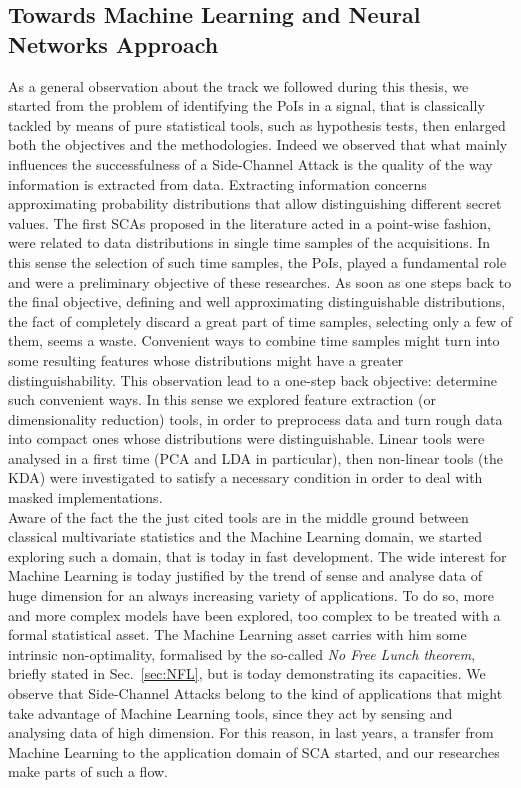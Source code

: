 \subsection{Towards Machine Learning and Neural Networks Approach}\label{sec:NN_intro} 
As a general observation about the track we followed during this thesis, we started from the problem of identifying the PoIs in a signal, that is classically tackled by means of pure statistical tools, such as hypothesis tests,  then enlarged both the objectives and the methodologies. Indeed we observed that what mainly influences the successfulness of a Side-Channel Attack is the quality of the way information is extracted from data. Extracting information concerns approximating probability distributions that allow distinguishing different secret values. The first SCAs proposed in the literature acted in a point-wise fashion, \ie were related to data distributions in single time samples of the acquisitions. In this sense the selection of such time samples, the PoIs, played a fundamental role and were a preliminary objective of these researches. As soon as one steps back to the final objective, \ie defining and well approximating distinguishable distributions, the fact of completely discard a great part of time samples, selecting only a few of them, seems a waste. Convenient ways to combine time samples might turn into some resulting features whose distributions might have a greater distinguishability. This observation lead to a one-step back objective: determine such convenient ways. In this sense we explored feature extraction (or dimensionality reduction) tools, in order to preprocess data and turn rough data into compact ones whose distributions were distinguishable. Linear tools were analysed in a first time (PCA and LDA in particular), then non-linear tools (the KDA) were investigated to satisfy a necessary condition in order to deal with masked implementations. \\

Aware of the fact the the just cited tools are in the middle ground between classical multivariate statistics and the Machine Learning domain, we started exploring such a domain, that is today  in fast development. The wide interest for Machine Learning is today justified by the trend of sense and analyse data of huge dimension for an always increasing variety of applications. To do so, more and more complex models have been explored, too complex to be treated with a formal statistical asset. The Machine Learning asset carries with him some intrinsic non-optimality, formalised by the so-called \emph{No Free Lunch theorem}, briefly stated in Sec.~\ref{sec:NFL}, but is today demonstrating its capacities. We observe that Side-Channel Attacks belong to the kind of applications that might take advantage of Machine Learning tools, since they act by sensing and analysing data of high dimension. For this reason, in last years, a transfer from Machine Learning to the application domain of SCA started, and our researches make parts of such a flow. \\

